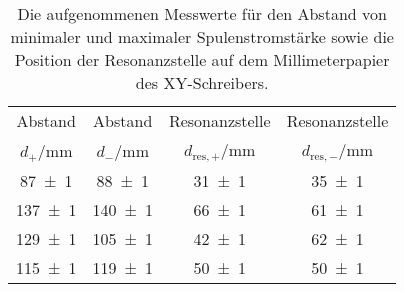 \begin{table}[!h]
	\centering
	\begin{tabular}{cccc}
		\toprule
		Abstand & Abstand & Resonanzstelle & Resonanzstelle\\
		$d_{+}$/\si{\milli\meter} & $d_{-}$/\si{\milli\meter} & $d_{\mathrm{res,+}}$/\si{\milli\meter} & $d_{\mathrm{res,-}}$/\si{\milli\meter}\\
\midrule
		\num{87(1)} & \num{88(1)} & \num{31(1)} & \num{35(1)}\\
		\num{137(1)} & \num{140(1)} & \num{66(1)} & \num{61(1)}\\
		\num{129(1)} & \num{105(1)} & \num{42(1)} & \num{62(1)}\\
		\num{115(1)} & \num{119(1)} & \num{50(1)} & \num{50(1)}\\
		\bottomrule
	\end{tabular}
	\caption{Die aufgenommenen Messwerte für den Abstand von minimaler und maximaler Spulenstromstärke
sowie die Position der Resonanzstelle auf dem Millimeterpapier des XY-Schreibers. \label{tab:messwerte_X}}
\end{table}
